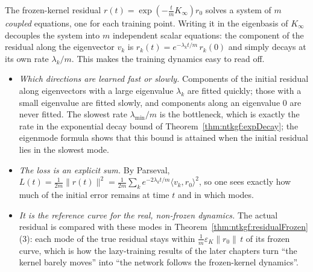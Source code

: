 \begin{remark}\label{rmk:ntkgf:eigenmodesUse}
The frozen-kernel residual $r(t)=\exp(-\tfrac tmK_\infty)r_0$ solves a system of $m$ \emph{coupled} equations, one for each training point. Writing it in the eigenbasis of $K_\infty$ decouples the system into $m$ independent scalar equations:
the component of the residual along the eigenvector $v_k$ is $r_k(t)=e^{-\lambda_kt/m}\,r_k(0)$ and simply decays at its own rate $\lambda_k/m$. This makes the training dynamics easy to read off.
\begin{itemize}
  \item \emph{Which directions are learned fast or slowly.} Components of the initial residual along eigenvectors with a large eigenvalue $\lambda_k$ are fitted quickly; those with a small eigenvalue are fitted slowly, and components along an eigenvalue $0$ are never fitted. The slowest rate $\lambda_{\min}/m$ is the bottleneck, which is exactly the rate in the exponential decay bound of Theorem~\ref{thm:ntkgf:expDecay}; the eigenmode formula shows that this bound is attained when the initial residual lies in the slowest mode.
  \item \emph{The loss is an explicit sum.} By Parseval, $L(t)=\tfrac1{2m}\|r(t)\|^2=\tfrac1{2m}\sum_ke^{-2\lambda_kt/m}\langle v_k,r_0\rangle^2$, so one sees exactly how much of the initial error remains at time $t$ and in which modes.
  \item \emph{It is the reference curve for the real, non-frozen dynamics.} The actual residual is compared with these modes in Theorem~\ref{thm:ntkgf:residualFrozen}(3): each mode of the true residual stays within $\tfrac1m\varepsilon_K\|r_0\|\,t$ of its frozen curve, which is how the lazy-training results of the later chapters turn ``the kernel barely moves'' into ``the network follows the frozen-kernel dynamics''.
\end{itemize}
\end{remark}

